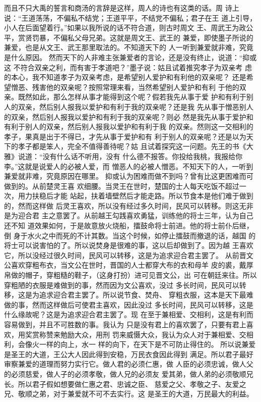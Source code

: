 \documentclass[12pt,UTF8]{ctexbook}
\begin{document}
而且不只大禹的誓言和商汤的言辞是这样，周人的诗也有这类的话。周 
诗上说：“王道荡荡，不偏私不结党；王道平平，不结党不偏私；君子在王 
道上引导，小人在后面望着行。”如果以我所说的话不符合道，则古时周文 
王、周武王为政公平，赏贤罚暴，不偏私父母兄弟。这就是周文王、武王的 
兼爱，即使墨子所说的兼爱，也是从文王、武王那里取法的。不知道天下的 
人一听到兼爱就非难，究竟是什么原因。 
然而天下的人非难主张兼爱者的言论，还是没有终止，说道：“抑或这 
不符合双亲之利，而有害于孝道吧？”墨子说：姑且试着推究孝子为双亲考 
虑的本心，我不知道孝子为双亲考虑，是希望别人爱护和有利他的双亲呢？ 
还是希望憎恶、残害他的双亲呢？按照常理来看，当然希望别人爱护和有利 
于他的双亲。既然如此，那么怎样从事才能得到这个呢？假若我先从事于爱 
护和有利于别人的双亲，然后别人报我以爱护和有利于我的双亲呢？还是我 
先从事于憎恶别人的双亲，然后别人报我以爱护和有利于我的双亲呢？则必 
然是我先从事于爱护和有利于别人的双亲，然后别人报我以爱护和有利于我 
的双亲。然则这一交相利的孝子，果真是出于不得已，才先从事于爱护和有 
利于别人的双亲呢？还是以为天下的孝子都是笨人，完全不值得善待呢？姑 
且试着探究这一问题。先王的书《大雅》说道：“没有什么话不听用，没有 
什么德不报答。你投给我桃，我报给你李。”这就是说爱人的必被人爱，而 
憎恶人的必被人憎恶。不知天下的人，一听到兼爱就非难，究竟原因在哪里。 
抑或认为困难而做不到吗？曾有比这更困难而可做到的。从前楚灵王喜 
欢细腰。当灵王在世时，楚国的士人每天吃饭不超过一次，用力扶稳后才能 
站起，扶着墙壁然后才能走路。所以节食本是他们难于做到的，然而这样做 
后灵王喜欢，所以没有经过多久时间，民风可以转移。则这无非是为迎合君 
主之意罢了。从前越王勾践喜欢勇猛，训练他的将士三年，认为自己还不知 
道效果如何，于是故意放火烧船，擂鼓命将士前进。他的将士前仆后继，倒 
身于水火之中而死的不计其数。当这个时候，如停止擂鼓而撤退的话，越国 
的将士可以说害怕的了。所以说焚身是很难的事，这以后却做到了。因为越 
王喜欢它，所以没经过很久时间，民风可以转移，这是为追求迎合君主罢了。 
从前晋文公喜欢穿粗布衣，当文公在世时，晋国的人士都穿大布的衣和母羊 
皮的裘，戴厚帛做的帽子，穿粗糙的鞋子，（这身打扮）进可见晋文公，出 
可在朝廷来往。所以穿粗陋的衣服是难做到的事，然而因为文公喜欢，没过 
多长时间，民风可以转移，这是为追求迎合君主罢了。所以说节食、焚舟、 
穿粗衣服，这本是天下最难做的事，然而这样做后可使君主喜欢，因此没过 
多长时间，民风可以转移，这是什么缘故呢？这是为追求迎合君主罢了。现 
在至于兼相爱、交相利，这是有利而容易做到，并且不可胜数的事。我认为 
只是没有君上的喜欢罢了，只要有君上喜欢，用奖赏称赞来勉励大众，用刑 
罚来威慑大众，我认为众人对于兼相爱、交相利，会像火一样的向上，水一 
样的向下，在天下是不可防止得住的。 
所以说兼爱是圣王的大道，王公大人因此得到安稳，万民衣食因此得到 
满足。所以君子最好审察兼爱的道理而努力实行它。做人君的必须仁惠，做 
人臣的必须忠诚，做人父的必须慈爱，做人子的必须孝敬，做人兄的必须友 
爱其弟，做人弟的必须敬顺兄长。所以君子假如想要做仁惠之君、忠诚之臣、 
慈爱之父、孝敬之子、友爱之兄、敬顺之弟，对于兼爱就不可不去实行。这 
是圣王的大道，万民最大的利益。 
\end{document}
